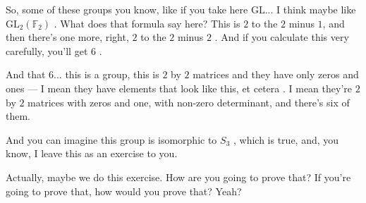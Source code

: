 \begin{speech}[01:26:43 - 01:27:45]
So, some of these groups you know, like if you take here $\mathrm{GL}$... I think maybe like $\mathrm{GL}_2(\mathbb{F}_2)$ . What does that formula say here? This is $2$ to the $2$ minus $1$, and then there's one more, right, $2$ to the $2$ minus $2$ . And if you calculate this very carefully, you'll get $6$ .

And that $6$... this is a group, this is $2$ by $2$ matrices and they have only zeros and ones --- I mean they have elements that look like this, et cetera . I mean they're $2$ by $2$ matrices with zeros and one, with non-zero determinant, and there's six of them.

And you can imagine this group is isomorphic to $S_3$ , which is true, and, you know, I leave this as an exercise to you.

Actually, maybe we do this exercise. How are you going to prove that? If you're going to prove that, how would you prove that? Yeah?
\end{speech}

\begin{content}

\end{content}

